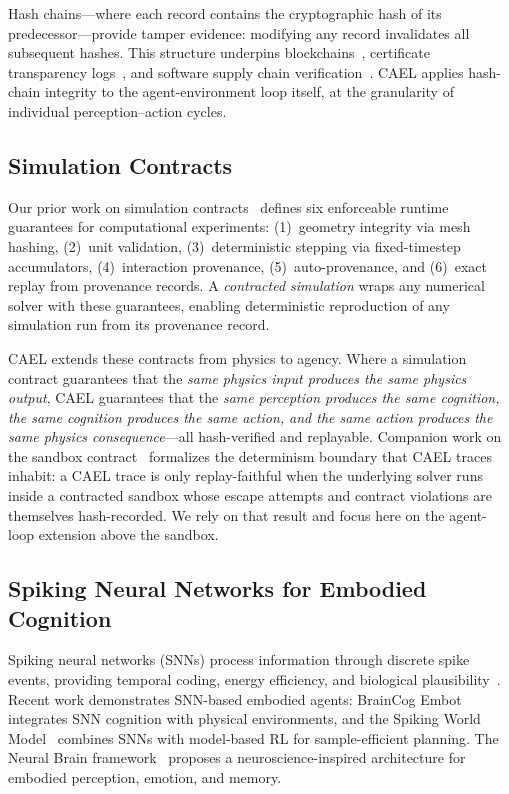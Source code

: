 \documentclass[sigconf,nonacm]{acmart}
\begin{document}
Hash chains---where each record contains the cryptographic hash of its
predecessor---provide tamper evidence: modifying any record invalidates all
subsequent hashes. This structure underpins blockchains~\cite{nakamoto2008},
certificate transparency logs~\cite{laurie2013ct}, and software supply
chain verification~\cite{sigstore2022}. CAEL applies hash-chain integrity
to the agent-environment loop itself, at the granularity of individual
perception--action cycles.

\subsection{Simulation Contracts}

Our prior work on simulation contracts~\cite{trustbyconstruction2026}
defines six enforceable runtime guarantees for computational experiments:
(1)~geometry integrity via mesh hashing, (2)~unit validation,
(3)~deterministic stepping via fixed-timestep accumulators,
(4)~interaction provenance, (5)~auto-provenance, and (6)~exact replay
from provenance records. A \emph{contracted simulation} wraps any
numerical solver with these guarantees, enabling deterministic
reproduction of any simulation run from its provenance record.

CAEL extends these contracts from physics to agency. Where a simulation
contract guarantees that the \emph{same physics input produces the same
physics output}, CAEL guarantees that the \emph{same perception produces
the same cognition, the same cognition produces the same action, and the
same action produces the same physics consequence}---all hash-verified
and replayable. Companion work on the sandbox contract~\cite{sandbox-paper}
formalizes the determinism boundary that CAEL traces inhabit: a CAEL trace
is only replay-faithful when the underlying solver runs inside a contracted
sandbox whose escape attempts and contract violations are themselves
hash-recorded. We rely on that result and focus here on the agent-loop
extension above the sandbox.

\subsection{Spiking Neural Networks for Embodied Cognition}

Spiking neural networks (SNNs) process information through discrete
spike events, providing temporal coding, energy efficiency, and
biological plausibility~\cite{maass1997snn, tavanaei2019snn}.
Recent work demonstrates SNN-based embodied agents: BrainCog
Embot~\cite{braincog2024} integrates SNN cognition with physical
environments, and the Spiking World Model~\cite{spiking-world2025}
combines SNNs with model-based RL for sample-efficient planning.
The Neural Brain framework~\cite{neuralbrain2025} proposes a
neuroscience-inspired architecture for embodied perception, emotion,
and memory.
\end{document}
